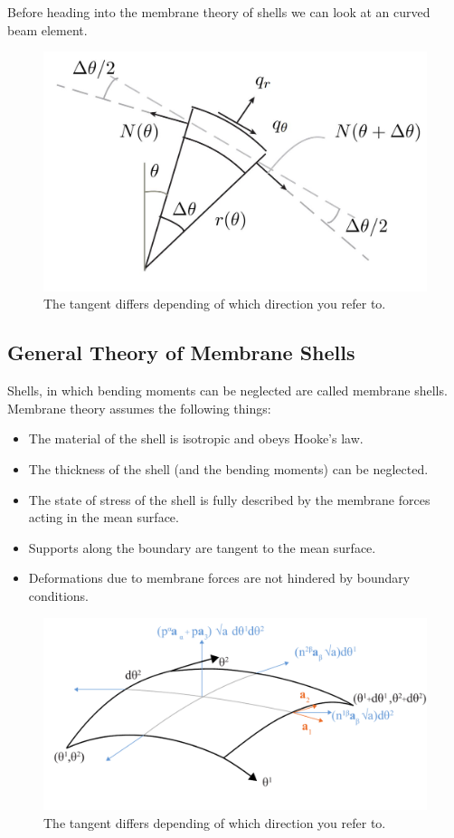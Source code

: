 Before heading into the membrane theory of shells we can look at an curved beam element.

\begin{figure}[H]
\centering
\includegraphics[height=0.5\linewidth ]{figure/Theory/CurvedBeam.JPG}
\caption{The tangent differs depending of which direction you refer to. }
\end{figure}
\subsection{General Theory of Membrane Shells}


Shells, in which bending moments can be neglected are called membrane
shells. Membrane theory assumes the following things:

\begin{itemize}
\item The material of the shell is isotropic and obeys Hooke's law.
\item The thickness of the shell (and the bending moments) can be neglected.
\item The state of stress of the shell is fully described by the membrane
forces acting in the mean surface.
\item Supports along the boundary are tangent to the mean surface.
\item Deformations due to membrane forces are not hindered by boundary
conditions.
\end{itemize}

\begin{figure}[H]
\centering
\includegraphics[width=0.9\linewidth ]{figure/Theory/membraneDefinition.pdf}
\caption{The tangent differs depending of which direction you refer to. }
\end{figure}


